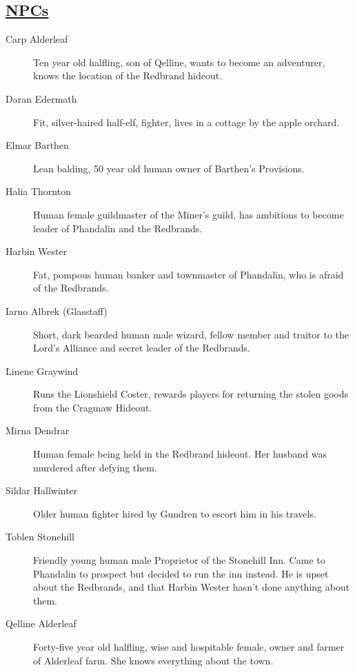 \subsection{\underline{NPCs}}
\begin{description}
	\item[Carp Alderleaf] Ten year old halfling, son of Qelline, wants to become an adventurer, knows the location of the Redbrand hideout.
	\item[Daran Edermath] Fit, silver-haired half-elf, fighter, lives in a cottage by the apple orchard.
	\item[Elmar Barthen] Lean balding, 50 year old human owner of Barthen's Provisions.
	\item[Halia Thornton] Human female guildmaster of the Miner's guild, has ambitions to become leader of Phandalin and the Redbrands.
	\item[Harbin Wester] Fat, pompous human banker and townmaster of Phandalin, who is afraid of the Redbrands.
	\item[Iarno Albrek (Glasstaff)] Short, dark bearded human male wizard, fellow member and traitor to the Lord's Alliance and secret leader of the Redbrands.
	\item[Linene Graywind] Runs the Lionshield Coster, rewards players for returning the stolen goods from the Cragmaw Hideout.
	\item[Mirna Dendrar] Human female being held in the Redbrand hideout. Her husband was murdered after defying them. 
	\item[Sildar Hallwinter] Older human fighter hired by Gundren to escort him in his travels.
	\item[Toblen Stonehill] Friendly young human male Proprietor of the Stonehill Inn. Came to Phandalin to prospect but decided to run the inn instead. He is upset about the Redbrands, and that Harbin Wester hasn't done anything about them.
	\item[Qelline Alderleaf] Forty-five year old halfling, wise and hospitable female, owner and farmer of Alderleaf farm. She knows everything about the town.
\end{description}